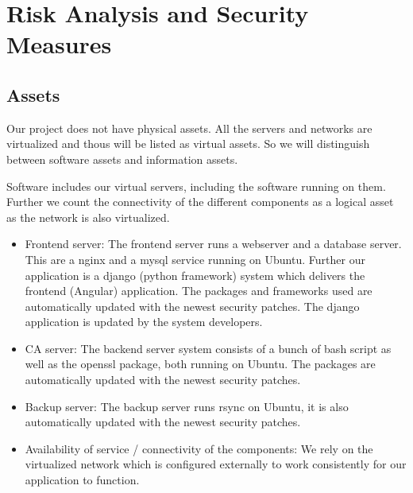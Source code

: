 \documentclass[english]{article}
\begin{document}

%


\section{Risk Analysis and Security Measures}

\subsection{Assets}


Our project does not have physical assets. All the servers and networks are virtualized and thous will be listed as virtual assets. So we will distinguish between software assets and information assets.

Software includes our virtual servers, including the software running on them. Further we count the connectivity of the different components as a logical asset as the network is also virtualized.

\begin{itemize}
	\item Frontend server: The frontend server runs a webserver and a database server. This are a nginx and a mysql service running on Ubuntu. Further our application is a django (python framework)  system which delivers the frontend (Angular) application. The packages and frameworks used are automatically updated with the newest security patches. The django application is updated by the system developers.
	\item CA server: The backend server system consists of a bunch of bash script as well as the openssl package, both running on Ubuntu. The packages are automatically updated with the newest security patches.
	\item Backup server: The backup server runs rsync on Ubuntu, it is also automatically updated with the newest security patches.
	\item Availability of service / connectivity of the components: We rely on the virtualized network which is configured externally to work consistently  for our application to function.
\end{itemize}
\end{document}
